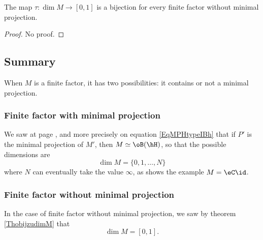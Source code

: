\begin{theorem}		\label{ThobijzudimM}
The map $\tau\colon \dim M\to [0,1]$ is a bijection for every finite factor without minimal projection.
\end{theorem}

\begin{proof}
No proof.
\end{proof}

					\subsection{Summary}

When $M$ is a finite factor, it has two possibilities: it contains or not a minimal projection.

					\subsubsection{Finite factor with minimal projection}

We saw at page \pageref{PgtypeIonavu}, and more precisely on equation \eqref{EqMPHtypeIBh} that if $P'$ is the minimal projection of $M'$, then $M\simeq\oB(\hH)$, so that the possible dimensions are
\begin{equation}
	\dim M=\{ 0,1,\ldots,N \}
\end{equation}
where $N$ can eventually take the value $\infty$, as shows the example $M=\eC\id$.

					\subsubsection{Finite factor without minimal projection}

In the case of finite factor without minimal projection, we saw by theorem \ref{ThobijzudimM} that 
\begin{equation}
	\dim M=[0,1].
\end{equation}

